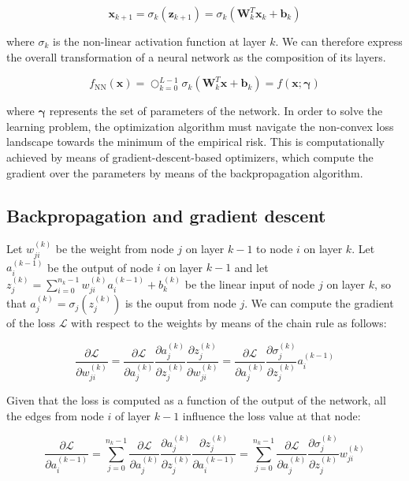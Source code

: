 $$
\bm{x}_{k+1} = \sigma_k(\bm{z}_{k+1}) = \sigma_k(\bm{W}_k^T \bm{x}_k + \bm{b}_k)
$$

where $\sigma_k$ is the non-linear activation function at layer $k$. We 
can therefore express the overall transformation of a neural network
as the composition of its layers.

$$
f_{\text{NN}}(\bm{x}) = \bigcirc_{k=0}^{L-1} \sigma_k(\bm{W}_k^T \bm{x} + \bm{b}_k) = f(\bm{x}; \bm{\gamma})
$$

where $\bm{\gamma}$ represents the set of parameters of the network. In order to solve the learning problem, the optimization algorithm must navigate the non-convex loss
landscape towards the minimum of the empirical risk. This is computationally achieved by means of gradient-descent-based optimizers, which compute the
gradient over the parameters by means of the backpropagation algorithm.

\subsection{Backpropagation and gradient descent}

Let $w_{ji}^{(k)}$ be the weight from node $j$ on layer $k-1$ to node $i$ on layer $k$. Let $a_i^{(k-1)}$ be the output of node $i$ on layer $k-1$ and let $z_j^{(k)} = \sum_{i=0}^{n_k - 1} w_{ji}^{(k)} a_i^{(k-1)} + b_k^{(k)}$ be 
the linear input of node $j$ on layer $k$, so that $a_j^{(k)} = \sigma_j(z_j^{(k)})$ is the ouput from node $j$. We can compute the gradient of the loss $\mathcal{L}$ with respect to the weights by means of the chain rule as follows: 

$$  
\frac{\partial \mathcal{L}}{\partial w_{ji}^{(k)}} = \frac{\partial \mathcal{L}}{\partial a_{j}^{(k)}} \frac{\partial a_{j}^{(k)}}{\partial z_{j}^{(k)}} \frac {\partial z_{j}^{(k)}} {\partial w_{ji}^{(k)}} =
\frac{\partial \mathcal{L}}{\partial a_{j}^{(k)}} \frac{\partial \sigma_j^{(k)}}{\partial z_{j}^{(k)}} a_i^{(k-1)}
$$

Given that the loss is computed as a function of the output of the network, all the edges from node $i$ of layer $k-1$ influence the loss value at that node:

$$
\frac{\partial \mathcal{L}}{\partial a_{i}^{(k-1)}} = \sum_{j=0}^{n_{k} - 1} \frac{\partial \mathcal{L}}{\partial a_{j}^{(k)}}  \frac{\partial a_{j}^{(k)}}{\partial z_{j}^{(k)}} \frac{\partial z_{j}^{(k)}}{\partial a_{i}^{(k-1)}} =
\sum_{j=0}^{n_{k} - 1} \frac{\partial \mathcal{L}}{\partial a_{j}^{(k)}} \frac{\partial \sigma_j^{(k)}}{\partial z_{j}^{(k)}} w_{ji}^{(k)}
$$

